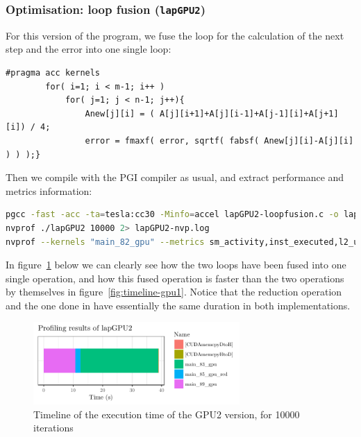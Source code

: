 \subsubsection{Optimisation: loop fusion (\texttt{lapGPU2})}

For this version of the program, we fuse the loop for the calculation of the next step and the error into one single loop:
\begin{lstlisting}[firstnumber=81]
#pragma acc kernels
		for( i=1; i < m-1; i++ )
			for( j=1; j < n-1; j++){
				Anew[j][i] = ( A[j][i+1]+A[j][i-1]+A[j-1][i]+A[j+1][i]) / 4;
				error = fmaxf( error, sqrtf( fabsf( Anew[j][i]-A[j][i] ) ) );}
\end{lstlisting}

Then we compile with the PGI compiler as usual, and extract performance and metrics information:
\begin{lstlisting}[language=bash]
pgcc -fast -acc -ta=tesla:cc30 -Minfo=accel lapGPU2-loopfusion.c -o lapGPU2 &> lapGPU2-comp.log
nvprof ./lapGPU2 10000 2> lapGPU2-nvp.log
nvprof --kernels "main_82_gpu" --metrics sm_activity,inst_executed,l2_utilization, dram_utilization,dram_read_throughput,dram_write_throughput,ipc ./lapGPU2 100 2> lapGPU2-metrics.log
\end{lstlisting}

In figure~\ref{fig:timeline-gpu2} below we can clearly see how the two loops have been fused into one single operation, and how this fused operation is faster than the two operations by themselves in figure~\ref{fig:timeline-gpu1}. Notice that the reduction operation and the one done in  have essentially the same duration in both implementations.
\begin{figure}[H]
	\centering
	\includegraphics[width=0.7\textwidth]{images/timeline-gpu2}
	\caption{Timeline of the execution time of the GPU2 version, for \num{10000} iterations}
	\label{fig:timeline-gpu2}
\end{figure}

